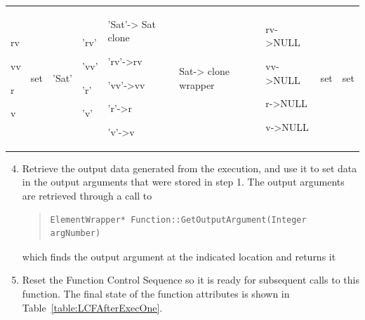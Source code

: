 \begin{center}
\begin{supertabular}{|p{0.5in}|p{0.5in}|p{0.4in}|p{0.4in}|p{0.5in}|p{0.68in}|p{0.67in}|p{0.5in}|
p{0.5in}|}
\begin{small}
rv

vv

r

v
\end{small} &
\begin{small}
set
\end{small} &
\begin{small}
'Sat'
\end{small} &
\begin{small}
'rv'

'vv'

'r'

'v'
\end{small} &
\begin{small}
'Sat'-> Sat clone

'rv'->rv

'vv'->vv

'r'->r

'v'->v

\end{small} &
\begin{small}
Sat-> clone wrapper
\end{small} &
\begin{small}
rv->NULL

vv->NULL

r->NULL

v->NULL
\end{small} &
\begin{small}
set
\end{small} &
\begin{small}
set
\end{small} \\
\end{supertabular}
\end{center}

\begin{enumerate}
\setcounter{enumi}{3}
\item Retrieve the output data generated from the execution, and use it to set data in the output
arguments that were stored in step 1.  The output arguments are retrieved through a call to

\begin{quote}
\begin{verbatim}
ElementWrapper* Function::GetOutputArgument(Integer argNumber)
\end{verbatim}
\end{quote}

\noindent which finds the output argument at the indicated location and returns it

\item Reset the Function Control Sequence so it is ready for subsequent calls to this function.  The
final state of the function attributes is shown in Table~\ref{table:LCFAfterExecOne}.
\end{enumerate}

